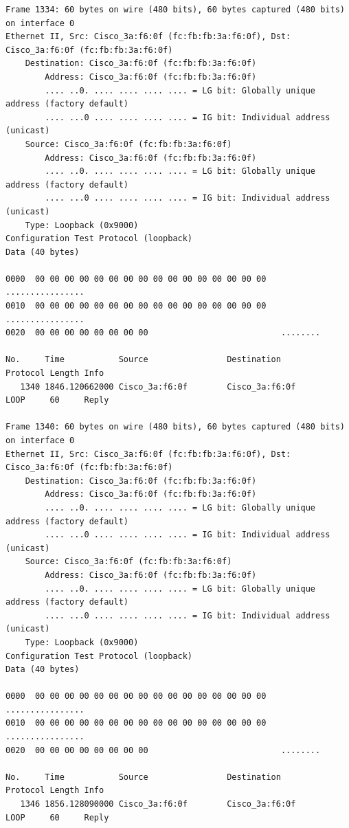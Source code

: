 \documentclass[a4paper,11pt]{article}
\begin{document}
\begin{lstlisting}
Frame 1334: 60 bytes on wire (480 bits), 60 bytes captured (480 bits) on interface 0
Ethernet II, Src: Cisco_3a:f6:0f (fc:fb:fb:3a:f6:0f), Dst: Cisco_3a:f6:0f (fc:fb:fb:3a:f6:0f)
    Destination: Cisco_3a:f6:0f (fc:fb:fb:3a:f6:0f)
        Address: Cisco_3a:f6:0f (fc:fb:fb:3a:f6:0f)
        .... ..0. .... .... .... .... = LG bit: Globally unique address (factory default)
        .... ...0 .... .... .... .... = IG bit: Individual address (unicast)
    Source: Cisco_3a:f6:0f (fc:fb:fb:3a:f6:0f)
        Address: Cisco_3a:f6:0f (fc:fb:fb:3a:f6:0f)
        .... ..0. .... .... .... .... = LG bit: Globally unique address (factory default)
        .... ...0 .... .... .... .... = IG bit: Individual address (unicast)
    Type: Loopback (0x9000)
Configuration Test Protocol (loopback)
Data (40 bytes)

0000  00 00 00 00 00 00 00 00 00 00 00 00 00 00 00 00   ................
0010  00 00 00 00 00 00 00 00 00 00 00 00 00 00 00 00   ................
0020  00 00 00 00 00 00 00 00                           ........

No.     Time           Source                Destination           Protocol Length Info
   1340 1846.120662000 Cisco_3a:f6:0f        Cisco_3a:f6:0f        LOOP     60     Reply

Frame 1340: 60 bytes on wire (480 bits), 60 bytes captured (480 bits) on interface 0
Ethernet II, Src: Cisco_3a:f6:0f (fc:fb:fb:3a:f6:0f), Dst: Cisco_3a:f6:0f (fc:fb:fb:3a:f6:0f)
    Destination: Cisco_3a:f6:0f (fc:fb:fb:3a:f6:0f)
        Address: Cisco_3a:f6:0f (fc:fb:fb:3a:f6:0f)
        .... ..0. .... .... .... .... = LG bit: Globally unique address (factory default)
        .... ...0 .... .... .... .... = IG bit: Individual address (unicast)
    Source: Cisco_3a:f6:0f (fc:fb:fb:3a:f6:0f)
        Address: Cisco_3a:f6:0f (fc:fb:fb:3a:f6:0f)
        .... ..0. .... .... .... .... = LG bit: Globally unique address (factory default)
        .... ...0 .... .... .... .... = IG bit: Individual address (unicast)
    Type: Loopback (0x9000)
Configuration Test Protocol (loopback)
Data (40 bytes)

0000  00 00 00 00 00 00 00 00 00 00 00 00 00 00 00 00   ................
0010  00 00 00 00 00 00 00 00 00 00 00 00 00 00 00 00   ................
0020  00 00 00 00 00 00 00 00                           ........

No.     Time           Source                Destination           Protocol Length Info
   1346 1856.128090000 Cisco_3a:f6:0f        Cisco_3a:f6:0f        LOOP     60     Reply


\end{lstlisting}
\end{document}
